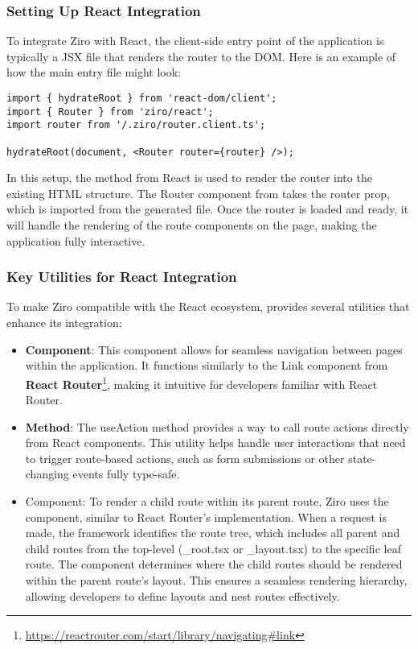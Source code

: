 \subsubsection{Setting Up React Integration}
To integrate Ziro with React, the client-side entry point of the application is typically a JSX file that renders the router to the DOM. Here is an example of how the main entry file might look:
\begin{verbatim}
import { hydrateRoot } from 'react-dom/client';
import { Router } from 'ziro/react';
import router from '/.ziro/router.client.ts';

hydrateRoot(document, <Router router={router} />);
\end{verbatim}

In this setup, the  method from React is used to render the router into the existing HTML structure. The Router component from  takes the router prop, which is imported from the generated  file. Once the router is loaded and ready, it will handle the rendering of the route components on the page, making the application fully interactive.

\subsubsection{Key Utilities for React Integration}
To make Ziro compatible with the React ecosystem,  provides several utilities that enhance its integration:
\begin{itemize}
  \item \textbf{ Component}: This component allows for seamless navigation between pages within the application. It functions similarly to the Link component from \textbf{React Router}\footnote{\url{https://reactrouter.com/start/library/navigating\#link}}, making it intuitive for developers familiar with React Router.
  \item \textbf{ Method}: The useAction method provides a way to call route actions directly from React components. This utility helps handle user interactions that need to trigger route-based actions, such as form submissions or other state-changing events fully type-safe.
  \item {} Component: To render a child route within its parent route, Ziro uses the  component, similar to React Router's implementation. When a request is made, the framework identifies the route tree, which includes all parent and child routes from the top-level (\_root.tsx or \_layout.tsx) to the specific leaf route. The  component determines where the child routes should be rendered within the parent route’s layout. This ensures a seamless rendering hierarchy, allowing developers to define layouts and nest routes effectively.
\end{itemize}

